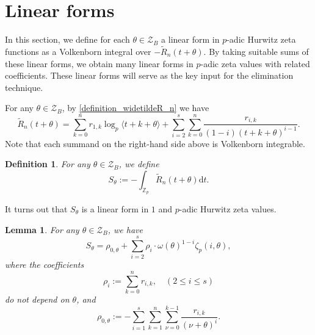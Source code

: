 \documentclass[12pt]{article}
\newtheorem{lemma}[theorem]{Lemma}
\newtheorem{definition}[theorem]{Definition}
\numberwithin{equation}{section}
\begin{document}
\section{Linear forms} \label{sec:LinearForms}

In this section, we define for each $\theta\in \mathcal{Z}_B$ a linear form in $p$-adic Hurwitz zeta functions as a Volkenborn integral over $-\widetilde{R}_n(t+\theta)$. By taking suitable sums of these linear forms, we obtain many linear forms in $p$-adic zeta values with related coefficients. These linear forms will serve as the key input for the elimination technique.

For any $\theta \in \mathcal{Z}_B$, by \eqref{definition_widetildeR_n} we have
\[ \widetilde{R}_n(t+\theta) = \sum_{k=0}^{n} r_{1,k}\log_p\langle t+k+\theta \rangle + \sum_{i=2}^{s}\sum_{k=0}^{n} \frac{r_{i,k}}{(1-i)(t+k+\theta)^{i-1}}.  \]
Note that each summand on the right-hand side above is Volkenborn integrable.

\begin{definition}
	For any $\theta \in \mathcal{Z}_B$, we define
	\[ S_{\theta} := -\int_{\mathbb{Z}_p} \widetilde{R}_n(t+\theta) \mathrm{d}t. \]
\end{definition}

It turns out that $S_{\theta}$ is a linear form in $1$ and $p$-adic Hurwitz zeta values.

\begin{lemma}\label{lemma_linear_form_S_theta}
For any $\theta \in \mathcal{Z}_B$, we have
\[ S_{\theta} = \rho_{0,\theta} + \sum_{i=2}^s \rho_i \cdot \omega(\theta)^{1-i}\zeta_p(i,\theta),  \]
where the coefficients
\begin{equation}\label{definition_rho_i}
\rho_{i}:=\sum_{k=0}^{n} r_{i,k}, \quad (2 \leqslant i \leqslant s)
\end{equation}
do not depend on $\theta$, and 
\begin{equation}\label{definition_rho_0theta}
\rho_{0,\theta}:=-\sum_{i=1}^{s}\sum_{k=1}^n\sum_{\nu=0}^{k-1} \frac{r_{i,k}}{(\nu+\theta)^{i}}.
\end{equation}
\end{lemma}
\end{document}
